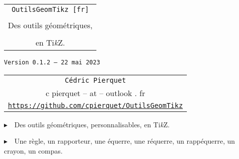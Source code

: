 \documentclass[french,a4paper,11pt]{article}
\def\TPversion{0.1.2}
\def\TPdate{22 mai 2023}
\begin{document}
\setlength{\aweboxleftmargin}{0.07\linewidth}
\setlength{\aweboxcontentwidth}{0.93\linewidth}
\setlength{\aweboxvskip}{8pt}

\thispagestyle{empty}

\vspace{2cm}

\begin{center}
	\begin{minipage}{0.75\linewidth}
	\begin{tcolorbox}[colframe=yellow,colback=yellow!15]
		\begin{center}
			\begin{tabular}{c}
				{\Huge \texttt{OutilsGeomTikz [fr]}}\\
				\\
				{\LARGE Des outils géométriques, } \\
				\\
				{\LARGE en Ti\textit{k}Z}. \\
			\end{tabular}
			
			\bigskip
			
			{\small \texttt{Version \TPversion{} -- \TPdate}}
		\end{center}
	\end{tcolorbox}
\end{minipage}
\end{center}

\begin{center}
	\begin{tabular}{c}
	\texttt{Cédric Pierquet}\\
	{\ttfamily c pierquet -- at -- outlook . fr}\\
	\texttt{\url{https://github.com/cpierquet/OutilsGeomTikz}}
\end{tabular}
\end{center}

\vspace{0.25cm}

{$\blacktriangleright$~~Des outils géométriques, personnalisables, en Ti\textit{k}Z.}

\smallskip

{$\blacktriangleright$~~Une règle, un rapporteur, une équerre, une réquerre, un rappéquerre, un crayon, un compas.}

\vspace{0.5cm}
\end{document}

